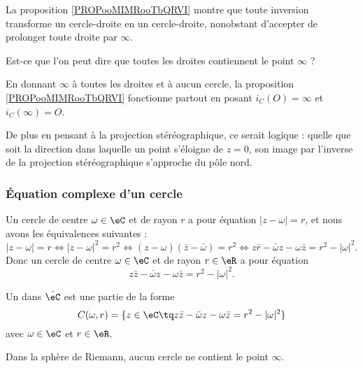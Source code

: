 \begin{probleme}        \label{PROBooZHHTooIFNwxR}
    La proposition \ref{PROPooMIMRooTbQRVI} montre que toute inversion transforme un cercle-droite en un cercle-droite, nonobstant d'accepter de prolonger toute droite par \( \infty\).

    Est-ce que l'on peut dire que toutes les droites contiennent le point \( \infty\) ?

    En donnant \( \infty\) à toutes les droites et à aucun cercle, la proposition \ref{PROPooMIMRooTbQRVI} fonctionne partout en posant \( i_C(O)=\infty\) et \( i_C(\infty)=O\).

    De plus en pensant à la projection stéréographique, ce serait logique : quelle que soit la direction dans laquelle un point s'éloigne de \( z=0\), son image par l'inverse de la projection stéréographique s'approche du pôle nord.
\end{probleme}

\subsubsection{Équation complexe d'un cercle}

Un cercle de centre \( \omega\in \eC\) et de rayon \( r\) a pour équation \( | z-\omega |=r\), et nous avons les équivalences suivantes :
\begin{equation}
    | z-\omega |=r\Leftrightarrow | z-\omega |^2=r^2\Leftrightarrow (z-\omega)(\bar z-\bar \omega)=r^2\Leftrightarrow z\bar r-\bar \omega z-\omega \bar z=r^2-| \omega |^2.
\end{equation}
Donc un cercle de centre \( \omega\in \eC\) et de rayon \( r\in \eR\) a pour équation
\begin{equation}        \label{EQooDIFRooKRZZoi}
    z\bar z-\bar\omega z-\omega\bar z=r^2-| \omega |^2.
\end{equation}

\begin{definition}      \label{DEFooAUDJooVqLDhe}
    Un  dans \( \hat\eC\) est une partie de la forme
    \begin{equation}
        C(\omega,r)=\{ z\in \eC\tq z\bar z-\bar\omega z-\omega\bar z=r^2-| \omega |^2 \}
    \end{equation}
    avec \( \omega\in \eC\) et \( r\in \eR\).
\end{definition}
Dans la sphère de Riemann, aucun cercle ne contient le point \( \infty\).

